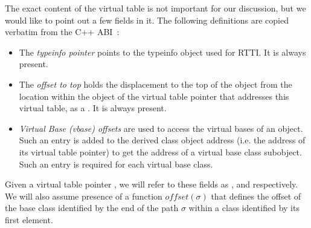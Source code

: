 
The exact content of the virtual table is not important for our discussion, but 
we would like to point out a few fields in it. The following definitions are 
copied verbatim from the C++ ABI~\cite[.2]{C++ABI}:

\begin{itemize}
\setlength{\itemsep}{0pt}
\setlength{\parskip}{0pt}
\item The \emph{typeinfo pointer} points to the typeinfo object used for RTTI. 
      It is always present.  
\item The \emph{offset to top} holds the displacement to the top of the object 
      from the location within the object of the virtual table pointer that 
      addresses this virtual table, as a . It is always present.
\item \emph{Virtual Base (vbase) offsets} are used to access the virtual bases 
      of an object. Such an entry is added to the derived class object address 
      (i.e. the address of its virtual table pointer) to get the address of a 
      virtual base class subobject. Such an entry is required for each virtual 
      base class.
\end{itemize}

\noindent
Given a virtual table pointer , we will refer to these fields as 
,  and  respectively. 
We will also assume presence of a function $\mathit{offset}(\sigma)$ that defines the 
offset of the base class identified by the end of the path $\sigma$ within a 
class identified by its first element.

